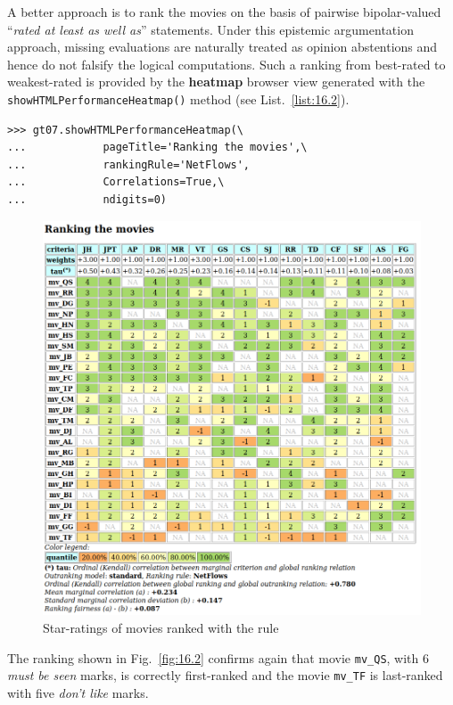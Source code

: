A better approach is to rank the movies on the basis of pairwise bipolar-valued  ``\emph{rated at least as well as}'' statements. Under this epistemic argumentation approach, missing evaluations are naturally treated as opinion abstentions and hence do not falsify the logical computations. Such a \NetFlows ranking from best-rated to weakest-rated is provided by the \textbf{heatmap} browser view generated with the \texttt{showHTMLPerformanceHeatmap()} method (see List.~\vref{list:16.2}).
\begin{lstlisting}[caption={Showing the movie from best to worst rated in a heatmap view},label=list:16.2]
>>> gt07.showHTMLPerformanceHeatmap(\
...            pageTitle='Ranking the movies',\  
...            rankingRule='NetFlows',
...            Correlations=True,\
...            ndigits=0)
\end{lstlisting}
\begin{figure}[ht]
\includegraphics[width=\hsize]{Figures/16-2-graffiti07_2.png}
\caption{Star-ratings of movies ranked with the \NetFlows rule}
\label{fig:16.2}       %
\end{figure}

The \NetFlows ranking shown in Fig.~\vref{fig:16.2} confirms again that movie \texttt{mv\_QS}, with $6$ \emph{must be seen} marks, is correctly first-ranked and the movie \texttt{mv\_TF} is last-ranked with five \emph{don't like} marks. 

